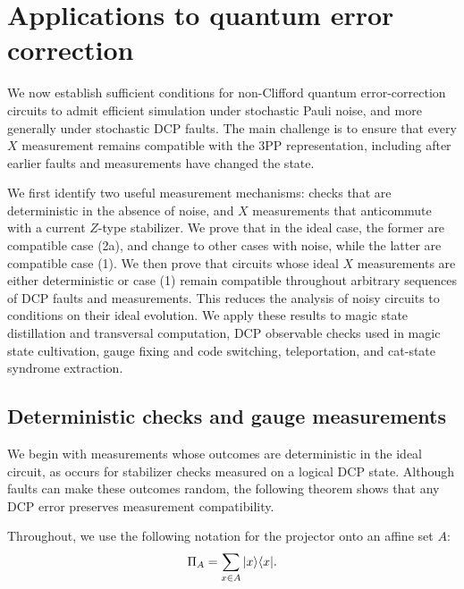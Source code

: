 \section{Applications to quantum error correction}\label{sec:noisy-simulations}

We now establish sufficient conditions for non-Clifford quantum error-correction circuits to admit efficient simulation under stochastic Pauli noise, and more generally under stochastic DCP faults.
The main challenge is to ensure that every $X$ measurement remains compatible with the 3PP representation, including after earlier faults and measurements have changed the state.

We first identify two useful measurement mechanisms: checks that are deterministic in the absence of noise, and $X$ measurements that anticommute with a current $Z$-type stabilizer.
We prove that in the ideal case, the former are compatible case (2a), and change to other cases with noise, while the latter are compatible case (1).
We then prove that circuits whose ideal $X$ measurements are either deterministic or case (1) remain compatible throughout arbitrary sequences of DCP faults and measurements.
This reduces the analysis of noisy circuits to conditions on their ideal evolution.
We apply these results to magic state distillation and transversal computation, DCP observable checks used in magic state cultivation, gauge fixing and code switching, teleportation, and cat-state syndrome extraction.

\subsection{Deterministic checks and gauge measurements}

We begin with measurements whose outcomes are deterministic in the ideal circuit, as occurs for stabilizer checks measured on a logical DCP state. Although faults can make these outcomes random, the following theorem shows that any DCP error preserves measurement compatibility.

Throughout, we use the following notation for the projector onto an affine set $A$:
\begin{align}
    \Pi_A = \sum_{x \in A} |x\rangle\langle x|.
\end{align}

